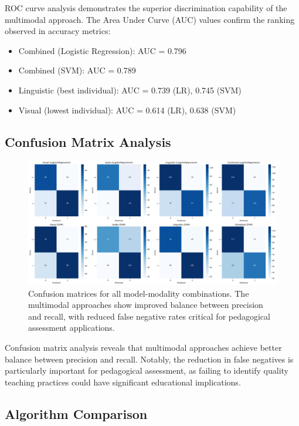 ROC curve analysis demonstrates the superior discrimination capability of the multimodal approach. The Area Under Curve (AUC) values confirm the ranking observed in accuracy metrics:
\begin{itemize}
    \item Combined (Logistic Regression): AUC = 0.796
    \item Combined (SVM): AUC = 0.789
    \item Linguistic (best individual): AUC = 0.739 (LR), 0.745 (SVM)
    \item Visual (lowest individual): AUC = 0.614 (LR), 0.638 (SVM)
\end{itemize}

\subsection{Confusion Matrix Analysis}

\begin{figure}[H]
    \centering
    \includegraphics[width=\textwidth]{sections/confusion_matrices.jpg}
    \caption{Confusion matrices for all model-modality combinations. The multimodal approaches show improved balance between precision and recall, with reduced false negative rates critical for pedagogical assessment applications.}
    \label{fig:confusion_matrices}
\end{figure}

Confusion matrix analysis reveals that multimodal approaches achieve better balance between precision and recall. Notably, the reduction in false negatives is particularly important for pedagogical assessment, as failing to identify quality teaching practices could have significant educational implications.

\subsection{Algorithm Comparison}

